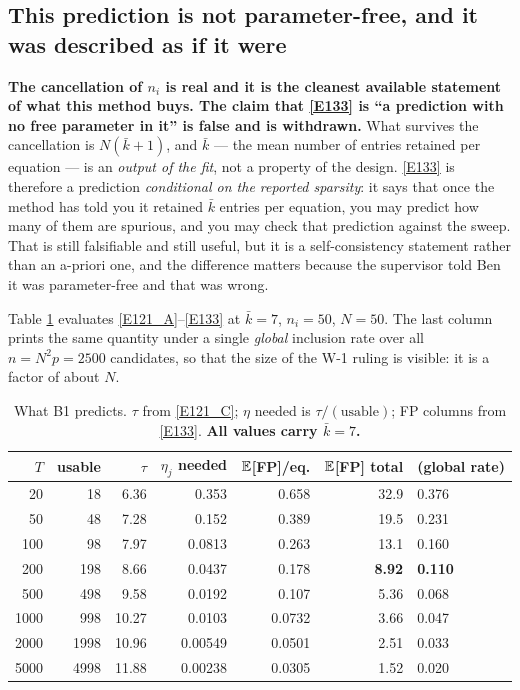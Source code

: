 \subsection[Not parameter-free]{This prediction is not parameter-free, and it was described as if it
were}\label{sec:notfree}

\begin{recordbox}
\textbf{The cancellation of $n_i$ is real and it is the cleanest available statement
of what this method buys. The claim that \eqref{E133} is ``a prediction with no free
parameter in it'' is false and is withdrawn.} What survives the cancellation is
$N(\bar k+1)$, and $\bar k$ --- the mean number of entries retained per equation ---
is an \emph{output of the fit}, not a property of the design. \eqref{E133} is
therefore a prediction \emph{conditional on the reported sparsity}: it says that once
the method has told you it retained $\bar k$ entries per equation, you may predict
how many of them are spurious, and you may check that prediction against the sweep.
That is still falsifiable and still useful, but it is a self-consistency statement
rather than an a-priori one, and the difference matters because the supervisor told
Ben it was parameter-free and that was wrong.
\end{recordbox}

Table \ref{tab:b1} evaluates \eqref{E121_A}--\eqref{E133} at $\bar k=7$, $n_i=50$,
$N=50$. The last column prints the same quantity under a single \emph{global}
inclusion rate over all $n=N^2p=2500$ candidates, so that the size of the W-1 ruling
is visible: it is a factor of about $N$.

\begin{table}[ht]
\caption{What B1 predicts. $\tau$ from \eqref{E121_C}; $\eta$ needed is
$\tau/(\text{usable})$; FP columns from \eqref{E133}. \textbf{All values carry
$\bar k=7$.}}\label{tab:b1}
\centering
\small
\begin{tabular}{rrrrrrl}
\toprule
$T$ & usable & $\tau$ & $\eta_j$ needed & $\mathbb{E}$[FP]/eq. & $\mathbb{E}$[FP] total &
  (global rate) \\
\midrule
20   & 18   & 6.36  & 0.353   & 0.658  & 32.9 & 0.376 \\
50   & 48   & 7.28  & 0.152   & 0.389  & 19.5 & 0.231 \\
100  & 98   & 7.97  & 0.0813  & 0.263  & 13.1 & 0.160 \\
200  & 198  & 8.66  & 0.0437  & 0.178  & \textbf{8.92} & \textbf{0.110} \\
500  & 498  & 9.58  & 0.0192  & 0.107  & 5.36 & 0.068 \\
1000 & 998  & 10.27 & 0.0103  & 0.0732 & 3.66 & 0.047 \\
2000 & 1998 & 10.96 & 0.00549 & 0.0501 & 2.51 & 0.033 \\
5000 & 4998 & 11.88 & 0.00238 & 0.0305 & 1.52 & 0.020 \\
\bottomrule
\end{tabular}
\end{table}

